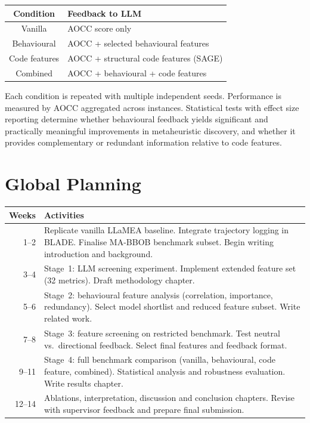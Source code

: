 \documentclass[12pt]{article}
\begin{document}
\begin{table}[h]
\centering
\begin{tabular}{@{}cl@{}}
\toprule
\textbf{Condition} & \textbf{Feedback to LLM} \\
\midrule
Vanilla & AOCC score only \\
Behavioural & AOCC + selected behavioural features \\
Code features & AOCC + structural code features (SAGE) \cite{vanStein2026LLaMEASAGE} \\
Combined & AOCC + behavioural + code features \\
\bottomrule
\end{tabular}
\end{table}

Each condition is repeated with multiple independent seeds. Performance is measured by AOCC aggregated across instances. Statistical tests with effect size reporting determine whether behavioural feedback yields significant and practically meaningful improvements in metaheuristic discovery, and whether it provides complementary or redundant information relative to code features.

\section{Global Planning}

\vspace{-0.5em}
\begin{table}[!ht]
\small
\centering
\begin{tabular}{@{}rp{11.5cm}@{}}
\toprule
\textbf{Weeks} & \textbf{Activities} \\
\midrule
1--2 & Replicate vanilla LLaMEA baseline. Integrate trajectory logging in BLADE. Finalise MA-BBOB benchmark subset. Begin writing introduction and background. \\[3pt]
3--4 & Stage~1: LLM screening experiment. Implement extended feature set (32 metrics). Draft methodology chapter. \\[3pt]
5--6 & Stage~2: behavioural feature analysis (correlation, importance, redundancy). Select model shortlist and reduced feature subset. Write related work. \\[3pt]
7--8 & Stage~3: feature screening on restricted benchmark. Test neutral vs.\ directional feedback. Select final features and feedback format. \\[3pt]
9--11 & Stage~4: full benchmark comparison (vanilla, behavioural, code feature, combined). Statistical analysis and robustness evaluation. Write results chapter. \\[3pt]
12--14 & Ablations, interpretation, discussion and conclusion chapters. Revise with supervisor feedback and prepare final submission. \\
\bottomrule
\end{tabular}
\end{table}

\newpage





\end{document}
